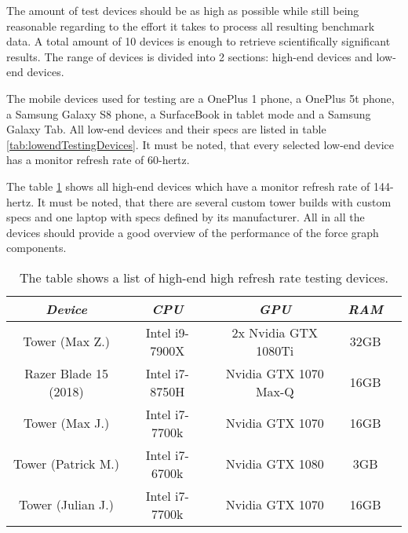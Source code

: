 The amount of test devices should be as high as possible while still being reasonable regarding to the effort it takes to process all resulting benchmark data. A total amount of 10 devices is enough to retrieve scientifically significant results. The range of devices is divided into 2 sections: high-end devices and low-end devices. 

The mobile devices used for testing are a OnePlus 1 phone, a OnePlus 5t phone, a Samsung Galaxy S8 phone, a SurfaceBook in tablet mode and a Samsung Galaxy Tab. All low-end devices and their specs are listed in table \ref{tab:lowendTestingDevices}. It must be noted, that every selected low-end device has a monitor refresh rate of 60-hertz. 

The table \ref{tab:highendTestingDevices} shows all high-end devices which have a monitor refresh rate of 144-hertz. It must be noted, that there are several custom tower builds with custom specs and one laptop with specs defined by its manufacturer. All in all the devices should provide a good overview of the performance of the force graph components.

\begin{table}
  \centering
  \begin{threeparttable}
    \caption{The table shows a list of high-end high refresh rate testing devices.}
    \label{tab:highendTestingDevices}
    \centering
    \def\rr{\rightskip=0pt plus1em \spaceskip=.3333em \xspaceskip=.5em\relax}
    \setlength{\tabcolsep}{1ex}
    \def\arraystretch{1.20}
    \setlength{\tabcolsep}{1ex}
    \small
    \begin{english}
      \begin{tabular}{|c||c|c|c|c|}
        \hline
          \multicolumn{1}{|c||}{\emph{Device}}&
          \multicolumn{1}{|c}{\emph{CPU}} &
          \multicolumn{1}{|c}{\emph{GPU}} &
          \multicolumn{1}{|c|}{\emph{RAM}} \\
        \hline
        \hline
        Tower (Max Z.) & 
        Intel i9-7900X & 
        2x Nvidia GTX 1080Ti & 
        32GB \\
        \hline
        Razer Blade 15 (2018) & 
        Intel i7-8750H & 
        Nvidia GTX 1070 Max-Q  & 
        16GB \\
        \hline
        Tower (Max J.) & 
        Intel i7-7700k & 
        Nvidia GTX 1070 & 
        16GB \\
        \hline
        Tower (Patrick M.) &
        Intel i7-6700k & 
        Nvidia GTX 1080 & 
        3GB \\
        \hline
        Tower (Julian J.) & 
        Intel i7-7700k & 
        Nvidia GTX 1070 & 
        16GB \\
        \hline
      \end{tabular}  
    \end{english}
  \end{threeparttable}
\end{table}

